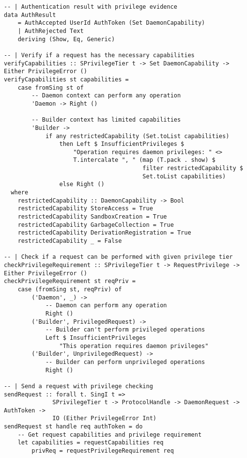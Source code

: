 \documentclass{article}
\begin{document}
\begin{tcolorbox}[title=Ten/Daemon/Protocol.hs Changes]
\begin{verbatim}
-- | Authentication result with privilege evidence
data AuthResult
    = AuthAccepted UserId AuthToken (Set DaemonCapability)
    | AuthRejected Text
    deriving (Show, Eq, Generic)

-- | Verify if a request has the necessary capabilities
verifyCapabilities :: SPrivilegeTier t -> Set DaemonCapability -> Either PrivilegeError ()
verifyCapabilities st capabilities =
    case fromSing st of
        -- Daemon context can perform any operation
        'Daemon -> Right ()

        -- Builder context has limited capabilities
        'Builder ->
            if any restrictedCapability (Set.toList capabilities)
                then Left $ InsufficientPrivileges $
                    "Operation requires daemon privileges: " <>
                    T.intercalate ", " (map (T.pack . show) $
                                        filter restrictedCapability $
                                        Set.toList capabilities)
                else Right ()
  where
    restrictedCapability :: DaemonCapability -> Bool
    restrictedCapability StoreAccess = True
    restrictedCapability SandboxCreation = True
    restrictedCapability GarbageCollection = True
    restrictedCapability DerivationRegistration = True
    restrictedCapability _ = False

-- | Check if a request can be performed with given privilege tier
checkPrivilegeRequirement :: SPrivilegeTier t -> RequestPrivilege -> Either PrivilegeError ()
checkPrivilegeRequirement st reqPriv =
    case (fromSing st, reqPriv) of
        ('Daemon', _) ->
            -- Daemon can perform any operation
            Right ()
        ('Builder', PrivilegedRequest) ->
            -- Builder can't perform privileged operations
            Left $ InsufficientPrivileges
                "This operation requires daemon privileges"
        ('Builder', UnprivilegedRequest) ->
            -- Builder can perform unprivileged operations
            Right ()

-- | Send a request with privilege checking
sendRequest :: forall t. SingI t =>
              SPrivilegeTier t -> ProtocolHandle -> DaemonRequest -> AuthToken ->
              IO (Either PrivilegeError Int)
sendRequest st handle req authToken = do
    -- Get request capabilities and privilege requirement
    let capabilities = requestCapabilities req
        privReq = requestPrivilegeRequirement req


\end{verbatim}
\end{tcolorbox}
\end{document}

